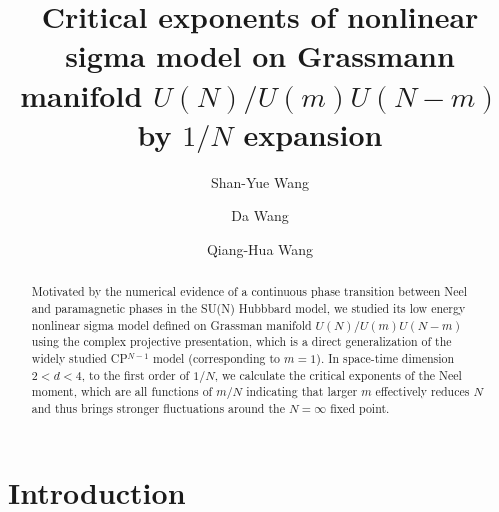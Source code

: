\documentclass[aps,twocolumn,superscriptaddress]{revtex4-1}
\begin{document}
\title{Critical exponents of nonlinear sigma model on Grassmann manifold $U(N)/U(m)U(N-m)$ by $1/N$ expansion}
\author{Shan-Yue Wang}
\author{Da Wang}
\author{Qiang-Hua Wang}
\begin{abstract}
  Motivated by the numerical evidence of a continuous phase transition between Neel and paramagnetic phases in the SU(N) Hubbbard model, we studied its low energy nonlinear sigma model defined on Grassman manifold $U(N)/U(m)U(N-m)$ using the complex projective presentation, which is a direct generalization of the widely studied CP$^{N-1}$ model (corresponding to $m=1$). In space-time dimension $2<d<4$, to the first order of $1/N$, we calculate the critical exponents of the Neel moment, which are all functions of $m/N$ indicating that larger $m$ effectively reduces $N$ and thus brings stronger fluctuations around the $N=\infty$ fixed point. 
\end{abstract}
\maketitle

\section{Introduction}
\end{document}
